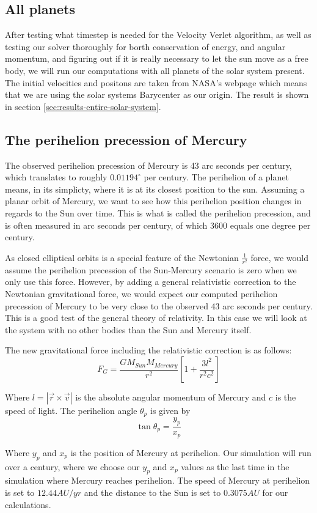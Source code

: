 \documentclass[../main.tex]{subfiles}
\begin{document}
\subsection{All planets}
After testing what timestep is needed for the Velocity Verlet algorithm, as well as testing our solver thoroughly for borth conservation of energy, and angular momentum, and figuring out if it is really necessary to let the sun move as a free body, we will run our computations with all planets of the solar system present.
The initial velocities and positons are taken from NASA's webpage \cite{HorizonsNASA} which means that we are using the solar systems Barycenter as our origin. The result is shown in section \ref{sec:results-entire-solar-system}.

\subsection{The perihelion precession of Mercury}
The observed perihelion precession of Mercury is 43 arc seconds per century, which translates to roughly $0.01194^\circ$ per century. The perihelion of a planet means, in its simplicty, where it is at its closest position to the sun. Assuming a planar orbit of Mercury, we want to see how this perihelion position changes in regards to the Sun over time. This is what is called the perihelion precession, and is often measured in arc seconds per century, of which $3600$ equals one degree per century.

As closed elliptical orbits is a special feature of the Newtonian $\frac{1}{r^2}$ force, we would assume the perihelion precession of the Sun-Mercury scenario is zero when we only use this force. However, by adding a general relativistic correction to the Newtonian gravitational force, we would expect our computed perihelion precession of Mercury to be very close to the observed 43 arc seconds per century. This is a good test of the general theory of relativity. In this case we will look at the system with no other bodies than the Sun and Mercury itself.

The new gravitational force including the relativistic correction is as follows:
$$F_G = \frac{GM_{Sun}M_{Mercury}}{r^2} \left[ 1+\frac {3l^2}{r^2c^2} \right]$$


 Where $l = |\vec r \times \vec v|$ is the absolute angular momentum of Mercury and $c$ is the speed of light. The perihelion angle $\theta_p$ is given by
\[\tan \theta_p = \frac{y_p}{x_p}\]

Where $y_p$ and $x_p$ is the position of Mercury at perihelion. Our simulation will run over a century, where we choose our $y_p$ and $x_p$ values as the last time in the simulation where Mercury reaches perihelion. The speed of Mercury at perihelion is set to $12.44 AU/yr$ and the distance to the Sun is set to $0.3075 AU$ for our calculations.
\end{document}
